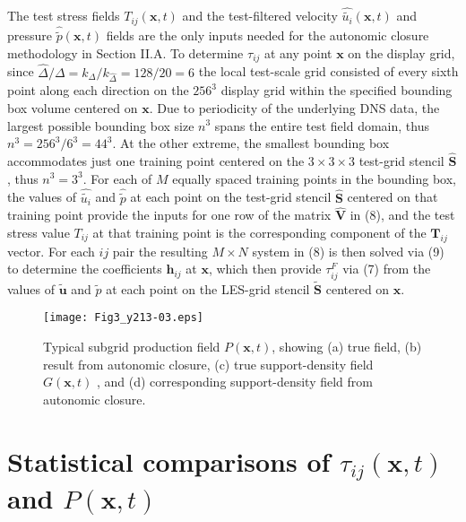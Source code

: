 The test stress fields $T_{ij}(\mathbf{x},t)$  and the test-filtered velocity  $\widehat{\widetilde{u_i}}(\mathbf{x},t)$  and pressure  $\widehat{\widetilde{p}}(\mathbf{x},t)$  fields are the only inputs needed for the autonomic closure methodology in Section II.A. To determine  $\tau_{ij}$ at any point $\mathbf{x}$ on the display grid, since  $\widehat{\Delta}/\Delta = k_{\Delta}/k_{\widehat{\Delta}} = 128/20 = 6$   the local test-scale grid consisted of every sixth point along each direction on the $256^3$ display grid within the specified bounding box volume centered on $\mathbf{x}$. Due to periodicity of the underlying DNS data, the largest possible bounding box size $n^3$ spans the entire test field domain, thus  $n^3 = 256^3/6^3 = 44^3$. At the other extreme, the smallest bounding box accommodates just one training point centered on the  $3 \times 3 \times 3$ test-grid stencil $\widehat{\mathbf{S}}$, thus $n^3 = 3^3$. For each of $M$ equally spaced training points in the bounding box, the values of $\widehat{\widetilde{u_i}}$  and  $\widehat{\widetilde{p}}$ at each point on the test-grid stencil $\widehat{\mathbf{S}}$  centered on that training point provide the inputs for one row of the matrix $\widehat{\mathbf{V}}$  in (8), and the test stress value  $T_{ij}$ at that training point is the corresponding component of the  $\mathbf{T}_{ij}$ vector. For each $ij$ pair the resulting $M \times N$  system in (8) is then solved via (9) to determine the coefficients $\mathbf{h}_{ij}$  at $\mathbf{x}$, which then provide $\tau_{ij}^{F}$   via (7) from the values of $\widetilde{\mathbf{u}}$  and $\widetilde{p}$   at each point on the LES-grid stencil $\widetilde{\mathbf{S}}$  centered on $\mathbf{x}$.  

%
\begin{figure}
	\begin{center}
	\texttt{[image: Fig3\_y213-03.eps]}
	\caption{ Typical subgrid production field $P(\mathbf{x},t)$, showing (a) true field, (b) result from autonomic closure, (c) true support-density field $G(\mathbf{x},t)$ , and (d) corresponding support-density field from autonomic closure. }
	\label{F:3}
	\end{center}
\end{figure}
%
%

\section{Statistical comparisons of $\tau_{ij}(\mathbf{x},t)$  and  $P(\mathbf{x},t)$ } 


